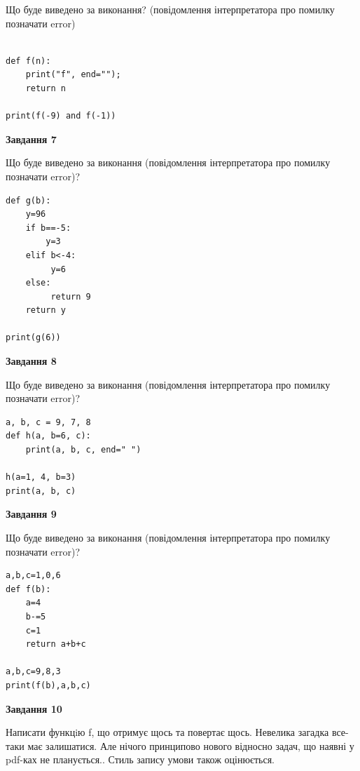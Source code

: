 \documentclass[12pt, ukrainian]{article}
\begin{document}
{\begin {large}
Що буде виведено за виконання? (повідомлення інтерпретатора про помилку позначати error)\par
\begin{verbatim}

def f(n):
    print("f", end="");
    return n

print(f(-9) and f(-1))
\end{verbatim}

{\begin {center}\textbf{Завдання 7}\end {center}}

Що буде виведено за виконання (повідомлення інтерпретатора про помилку позначати error)?\par
\begin{verbatim}
def g(b):
    y=96
    if b==-5: 
        y=3
    elif b<-4:
         y=6
    else:
         return 9
    return y

print(g(6))
\end{verbatim}

{\begin {center}\textbf{Завдання 8}\end {center}}

Що буде виведено за виконання (повідомлення інтерпретатора про помилку позначати error)?\par
\begin{verbatim}
a, b, c = 9, 7, 8
def h(a, b=6, c):
    print(a, b, c, end=" ")

h(a=1, 4, b=3)
print(a, b, c)
\end{verbatim}

{\begin {center}\textbf{Завдання 9}\end {center}}

Що буде виведено за виконання (повідомлення інтерпретатора про помилку позначати error)?\par
\begin{verbatim}
a,b,c=1,0,6
def f(b):
    a=4
    b-=5
    c=1
    return a+b+c

a,b,c=9,8,3
print(f(b),a,b,c)
\end{verbatim}

{\begin {center}\textbf{Завдання 10}\end {center}}


Написати функцiю f, що отримує щось та повертає щось. Невелика загадка все-таки має залишатися. Але нічого принципово нового відносно задач, що наявні у pdf-ках не планується.. Стиль запису умови також оцінюється.\par
\end {large}}
\newpage
\end{document}

